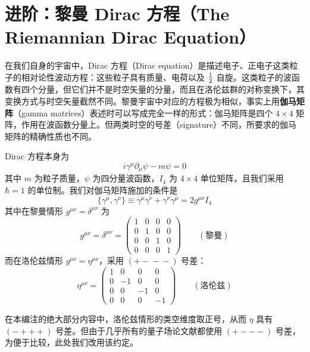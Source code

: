 \section{进阶：黎曼 Dirac 方程（The Riemannian Dirac Equation）}

在我们自身的宇宙中，Dirac 方程（Dirac equation）是描述电子、正电子这类粒子的相对论性波动方程：这些粒子具有质量、电荷以及 $\tfrac{1}{2}$ 自旋。这类粒子的波函数有四个分量，但它们并不是时空矢量的分量，而且在洛伦兹群的对称变换下，其变换方式与时空矢量截然不同。黎曼宇宙中对应的方程极为相似，事实上用\textbf{伽马矩阵}（gamma matrices）表述时可以写成完全一样的形式：伽马矩阵是四个 $4\times4$ 矩阵，作用在波函数分量上。但两类时空的号差（signature）不同，所要求的伽马矩阵的精确性质也不同。

Dirac 方程本身为
\begin{equation}
i\gamma^{\mu}\partial_{\mu}\psi - m\psi = 0 \tag{Dirac Equation}
\end{equation}
其中 $m$ 为粒子质量，$\psi$ 为四分量波函数，$I_{4}$ 为 $4\times4$ 单位矩阵，且我们采用 $\hbar=1$ 的单位制。我们对伽马矩阵施加的条件是
\begin{equation}
\{\gamma^{\mu},\gamma^{\nu}\}\equiv\gamma^{\mu}\gamma^{\nu}+\gamma^{\nu}\gamma^{\mu}=2g^{\mu\nu}I_{4} \tag{Common}
\end{equation}
其中在黎曼情形 $g^{\mu\nu}=\delta^{\mu\nu}$ 为
\begin{equation}
g^{\mu\nu}=\delta^{\mu\nu}=
\begin{pmatrix}
1&0&0&0\\
0&1&0&0\\
0&0&1&0\\
0&0&0&1
\end{pmatrix}
\qquad(\text{黎曼})
\end{equation}
而在洛伦兹情形 $g^{\mu\nu}=\eta^{\mu\nu}$，采用 $(+{}-{}-{}-)$ 号差：
\begin{equation}
\eta^{\mu\nu}=
\begin{pmatrix}
1&0&0&0\\
0&-1&0&0\\
0&0&-1&0\\
0&0&0&-1
\end{pmatrix}
\qquad(\text{洛伦兹})
\end{equation}

\begin{notebox}[关于度规号差的约定]
在本编注的绝大部分内容中，洛伦兹情形的类空维度取正号，从而 $\eta$ 具有 $(-+++)$ 号差。但由于几乎所有的量子场论文献都使用 $(+---)$ 号差，为便于比较，此处我们改用该约定。
\end{notebox}

